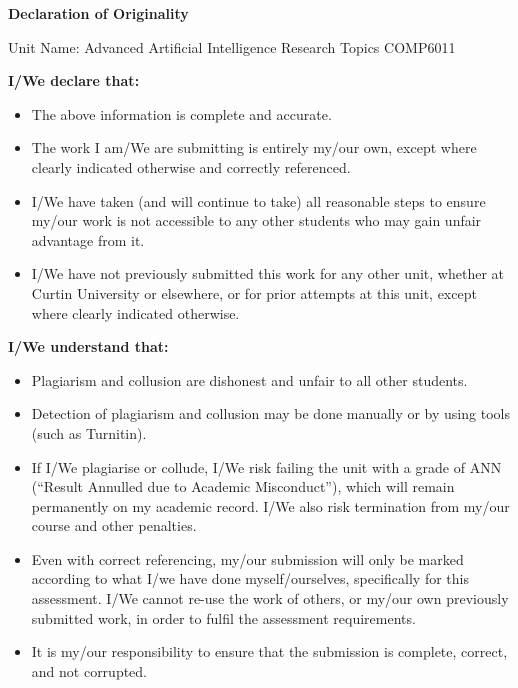 \documentclass[10pt,journal,compsoc]{IEEEtran}
\begin{document}
\onecolumn
\thispagestyle{empty}  %

\begin{center}
    {\LARGE \textbf{Declaration of Originality}}\\ \vspace{1cm}
    
    {\Large Unit Name: Advanced Artificial Intelligence Research Topics COMP6011}\\ \vspace{1cm}
    
\end{center}

    \textbf{I/We declare that:}
    \begin{itemize}
        \item The above information is complete and accurate.
        \item The work I am/We are submitting is entirely my/our own, except where clearly indicated otherwise and correctly referenced.
        \item I/We have taken (and will continue to take) all reasonable steps to ensure my/our work is not accessible to any other students who may gain unfair advantage from it.
        \item I/We have not previously submitted this work for any other unit, whether at Curtin University or elsewhere, or for prior attempts at this unit, except where clearly indicated otherwise.
    \end{itemize}

    \textbf{I/We understand that:}
    \begin{itemize}
        \item Plagiarism and collusion are dishonest and unfair to all other students.
        \item Detection of plagiarism and collusion may be done manually or by using tools (such as Turnitin).
        \item If I/We plagiarise or collude, I/We risk failing the unit with a grade of ANN (“Result Annulled due to Academic Misconduct”), which will remain permanently on my academic record. I/We also risk termination from my/our course and other penalties.
        \item Even with correct referencing, my/our submission will only be marked according to what I/we have done myself/ourselves, specifically for this assessment. I/We cannot re-use the work of others, or my/our own previously submitted work, in order to fulfil the assessment requirements.
        \item It is my/our responsibility to ensure that the submission is complete, correct, and not corrupted.
    \end{itemize}
\end{document}
